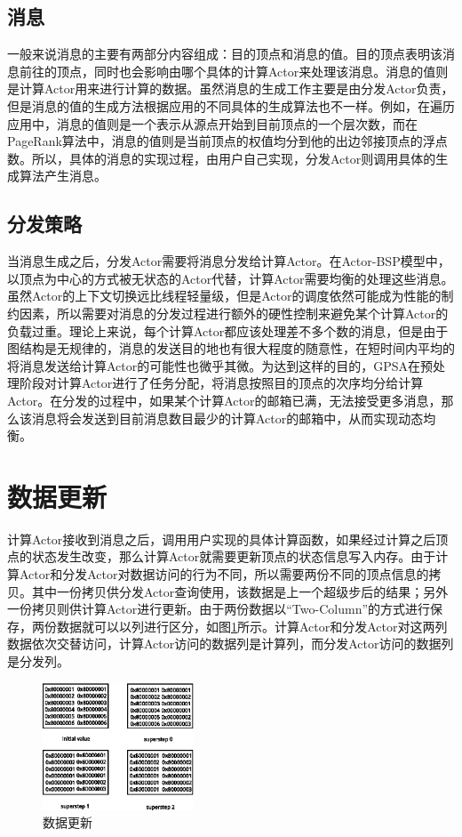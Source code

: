 \subsection{消息}
一般来说消息的主要有两部分内容组成：目的顶点和消息的值。目的顶点表明该消息前往的顶点，同时也会影响由哪个具体的计算Actor来处理该消息。消息的值则是计算Actor用来进行计算的数据。虽然消息的生成工作主要是由分发Actor负责，但是消息的值的生成方法根据应用的不同具体的生成算法也不一样。例如，在遍历应用中，消息的值则是一个表示从源点开始到目前顶点的一个层次数，而在PageRank算法中，消息的值则是当前顶点的权值均分到他的出边邻接顶点的浮点数。所以，具体的消息的实现过程，由用户自己实现，分发Actor则调用具体的生成算法产生消息。
\subsection{分发策略}
当消息生成之后，分发Actor需要将消息分发给计算Actor。在Actor-BSP模型中，以顶点为中心的方式被无状态的Actor代替，计算Actor需要均衡的处理这些消息。虽然Actor的上下文切换远比线程轻量级，但是Actor的调度依然可能成为性能的制约因素，所以需要对消息的分发过程进行额外的硬性控制来避免某个计算Actor的负载过重。理论上来说，每个计算Actor都应该处理差不多个数的消息，但是由于图结构是无规律的，消息的发送目的地也有很大程度的随意性，在短时间内平均的将消息发送给计算Actor的可能性也微乎其微。为达到这样的目的，GPSA在预处理阶段对计算Actor进行了任务分配，将消息按照目的顶点的次序均分给计算Actor。在分发的过程中，如果某个计算Actor的邮箱已满，无法接受更多消息，那么该消息将会发送到目前消息数目最少的计算Actor的邮箱中，从而实现动态均衡。

\section{数据更新}
计算Actor接收到消息之后，调用用户实现的具体计算函数，如果经过计算之后顶点的状态发生改变，那么计算Actor就需要更新顶点的状态信息写入内存。由于计算Actor和分发Actor对数据访问的行为不同，所以需要两份不同的顶点信息的拷贝。其中一份拷贝供分发Actor查询使用，该数据是上一个超级步后的结果；另外一份拷贝则供计算Actor进行更新。由于两份数据以“Two-Column”的方式进行保存，两份数据就可以以列进行区分，如图\ref{fig:vu}所示。计算Actor和分发Actor对这两列数据依次交替访问，计算Actor访问的数据列是计算列，而分发Actor访问的数据列是分发列。

\begin{figure}[htbp]
\centering
\includegraphics[width=0.4\textwidth]{myfigures/valueupdating.eps}
\caption{数据更新}\label{fig:vu}
\vspace{\baselineskip}
\end{figure}

